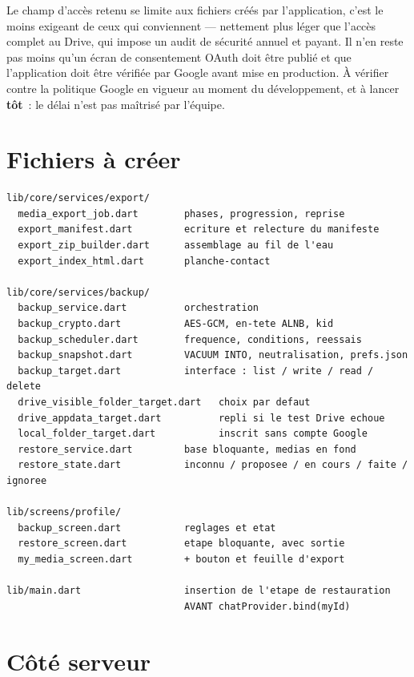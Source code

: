 \documentclass[11pt,a4paper,oneside]{report}
\begin{document}
\begin{alerte}
Le champ d'accès retenu se limite aux fichiers créés par l'application, c'est le moins
exigeant de ceux qui conviennent --- nettement plus léger que l'accès complet au Drive, qui
impose un audit de sécurité annuel et payant. Il n'en reste pas moins qu'un écran de
consentement OAuth doit être publié et que l'application doit être vérifiée par Google avant
mise en production. À vérifier contre la politique Google en vigueur au moment du
développement, et à lancer \textbf{tôt}~: le délai n'est pas maîtrisé par l'équipe.
\end{alerte}

\section{Fichiers à créer}

\begin{lstlisting}[style=Alanya, language={}]
lib/core/services/export/
  media_export_job.dart        phases, progression, reprise
  export_manifest.dart         ecriture et relecture du manifeste
  export_zip_builder.dart      assemblage au fil de l'eau
  export_index_html.dart       planche-contact

lib/core/services/backup/
  backup_service.dart          orchestration
  backup_crypto.dart           AES-GCM, en-tete ALNB, kid
  backup_scheduler.dart        frequence, conditions, reessais
  backup_snapshot.dart         VACUUM INTO, neutralisation, prefs.json
  backup_target.dart           interface : list / write / read / delete
  drive_visible_folder_target.dart   choix par defaut
  drive_appdata_target.dart          repli si le test Drive echoue
  local_folder_target.dart           inscrit sans compte Google
  restore_service.dart         base bloquante, medias en fond
  restore_state.dart           inconnu / proposee / en cours / faite / ignoree

lib/screens/profile/
  backup_screen.dart           reglages et etat
  restore_screen.dart          etape bloquante, avec sortie
  my_media_screen.dart         + bouton et feuille d'export

lib/main.dart                  insertion de l'etape de restauration
                               AVANT chatProvider.bind(myId)
\end{lstlisting}

\section{Côté serveur}
\end{document}
